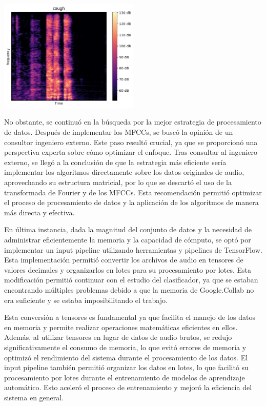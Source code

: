 \begin{center}
    \includegraphics[width=0.5\textwidth]{ImagenesLatex/espectrograma.jpg}
\end{center}


No obstante, se continuó en la búsqueda por la mejor estrategia de procesamiento de datos. Después de implementar los MFCCs, se buscó la opinión de un consultor ingeniero externo. Este paso resultó crucial, ya que se proporcionó una perspectiva experta sobre cómo optimizar el enfoque. Tras consultar al ingeniero externo, se llegó a la conclusión de que la estrategia más eficiente sería implementar los algoritmos directamente sobre los datos originales de audio, aprovechando su estructura matricial, por lo que se descartó el uso de la transformada de Fourier y de los MFCCs. Esta recomendación permitió optimizar el proceso de procesamiento de datos y la aplicación de los algoritmos de manera más directa y efectiva.

En última instancia, dada la magnitud del conjunto de datos y la necesidad de administrar eficientemente la memoria y la capacidad de cómputo, se optó por implementar un input pipeline utilizando herramientas y pipelines de TensorFlow. Esta implementación permitió convertir los archivos de audio en tensores de valores decimales y organizarlos en lotes para su procesamiento por lotes. Esta modificación permitió continuar con el estudio del clasificador, ya que se estaban encontrando múltiples problemas debido a que la memoria de Google.Collab no era suficiente y se estaba imposibilitando el trabajo.

Esta conversión a tensores es fundamental ya que facilita el manejo de los datos en memoria y permite realizar operaciones matemáticas eficientes en ellos. Además, al utilizar tensores en lugar de datos de audio brutos, se redujo significativamente el consumo de memoria, lo que evitó errores de memoria y optimizó el rendimiento del sistema durante el procesamiento de los datos.  El input pipeline también permitió organizar los datos en lotes, lo que facilitó su procesamiento por lotes durante el entrenamiento de modelos de aprendizaje automático. Esto aceleró el proceso de entrenamiento y mejoró la eficiencia del sistema en general. 

